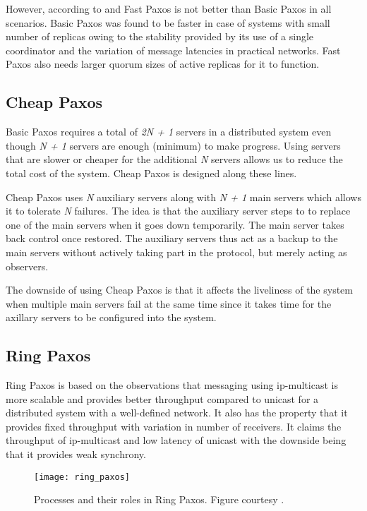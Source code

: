However, according to \citet{Vieira08theperformance} and \citet{Junqueira2007}
Fast Paxos is not better than Basic Paxos in all scenarios. Basic Paxos was 
found to be faster in case of systems with small number of replicas owing to 
the stability provided by its use of a single coordinator and the variation
of message latencies in practical networks. Fast Paxos also needs larger quorum 
sizes of active replicas for it to function.

\subsection{Cheap Paxos}

Basic Paxos requires a total of \emph{2N + 1} servers in a distributed system 
even though \emph{N + 1} servers are enough (minimum) to make progress. 
Using servers that are slower or cheaper for the additional \emph{N} servers
allows us to reduce the total cost of the system. Cheap Paxos is designed along 
these lines.

Cheap Paxos uses \emph{N} auxiliary servers along with \emph{N + 1} main servers
which allows it to tolerate \emph{N} failures. The idea is that the auxiliary
server steps to to replace one of the main servers when it goes down 
temporarily. The main server takes back control once restored. The auxiliary
servers thus act as a backup to the main servers without actively taking part
in the protocol, but merely acting as observers.

The downside of using Cheap Paxos is that it affects the liveliness of the 
system when multiple main servers fail at the same time since it takes time
for the axillary servers to be configured into the system.

\subsection{Ring Paxos}

Ring Paxos \citep{MarandiPSP10} is based on the observations that messaging
using ip-multicast is more scalable and provides better throughput compared
to unicast for a distributed system with a well-defined network. It also
has the property that it provides fixed throughput with variation in number
of receivers. It claims the throughput of ip-multicast and low latency of
unicast with the downside being that it provides weak synchrony.

\begin{figure}
  \texttt{[image: ring\_paxos]}
  \caption[Ring Paxos]{%
  Processes and their roles in Ring Paxos. Figure courtesy 
  \citep{MarandiPSP10}.}
  \label{figure:ring.paxos}
\end{figure}

